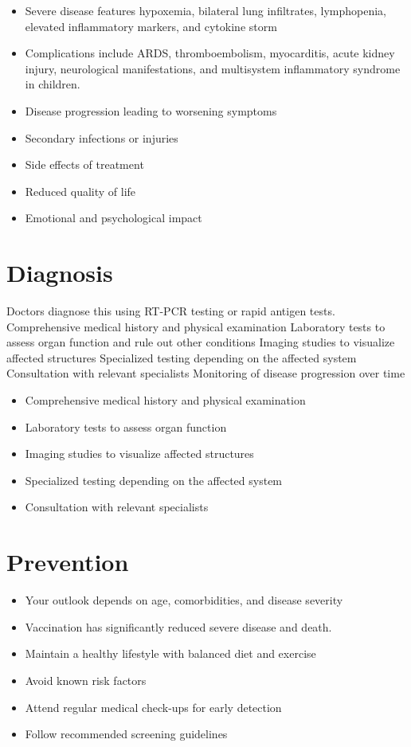 \begin{itemize}[noitemsep]
  \item Severe disease features hypoxemia, bilateral lung infiltrates, lymphopenia, elevated inflammatory markers, and cytokine storm
  \item Complications include ARDS, thromboembolism, myocarditis, acute kidney injury, neurological manifestations, and multisystem inflammatory syndrome in children.
  \item Disease progression leading to worsening symptoms
  \item Secondary infections or injuries
  \item Side effects of treatment
  \item Reduced quality of life
  \item Emotional and psychological impact
\end{itemize}
\section{Diagnosis}
Doctors diagnose this using RT-PCR testing or rapid antigen tests. Comprehensive medical history and physical examination Laboratory tests to assess organ function and rule out other conditions Imaging studies to visualize affected structures Specialized testing depending on the affected system Consultation with relevant specialists Monitoring of disease progression over time

\begin{itemize}[noitemsep]
  \item Comprehensive medical history and physical examination
  \item Laboratory tests to assess organ function
  \item Imaging studies to visualize affected structures
  \item Specialized testing depending on the affected system
  \item Consultation with relevant specialists
\end{itemize}
\section{Prevention}
\begin{itemize}[noitemsep]
  \item Your outlook depends on age, comorbidities, and disease severity
  \item Vaccination has significantly reduced severe disease and death.
  \item Maintain a healthy lifestyle with balanced diet and exercise
  \item Avoid known risk factors
  \item Attend regular medical check-ups for early detection
  \item Follow recommended screening guidelines
\end{itemize}
